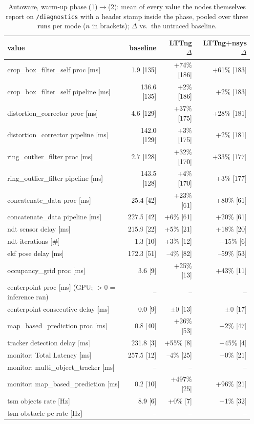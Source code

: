 \begin{table}[t]\centering\scriptsize
\caption{Autoware, warm-up phase (1)$\rightarrow$(2): mean of every value the nodes themselves report on \texttt{/diagnostics} with a header stamp inside the phase, pooled over three runs per mode ($n$ in brackets); $\Delta$ vs.\ the untraced baseline.}
\label{tab:aw-phase-warmup}
\begin{tabular}{lrrr}
\toprule
value & baseline & LTTng $\Delta$ & LTTng+nsys $\Delta$ \\
\midrule
crop\_box\_filter\_self proc [ms] & 1.9 [135] & +74\% [186] & +61\% [183] \\
crop\_box\_filter\_self pipeline [ms] & 136.6 [135] & +2\% [186] & +2\% [183] \\
distortion\_corrector proc [ms] & 4.6 [129] & +37\% [175] & +28\% [181] \\
distortion\_corrector pipeline [ms] & 142.0 [129] & +3\% [175] & +2\% [181] \\
ring\_outlier\_filter proc [ms] & 2.7 [128] & +32\% [170] & +33\% [177] \\
ring\_outlier\_filter pipeline [ms] & 143.5 [128] & +4\% [170] & +3\% [177] \\
concatenate\_data proc [ms] & 25.4 [42] & +23\% [61] & +80\% [61] \\
concatenate\_data pipeline [ms] & 227.5 [42] & +6\% [61] & +20\% [61] \\
ndt sensor delay [ms] & 215.9 [22] & +5\% [21] & +18\% [20] \\
ndt iterations [\#] & 1.3 [10] & +3\% [12] & +15\% [6] \\
ekf pose delay [ms] & 172.3 [51] & --4\% [82] & --59\% [53] \\
occupancy\_grid proc [ms] & 3.6 [9] & +25\% [13] & +43\% [11] \\
centerpoint proc [ms] (GPU; $>$0 = inference ran) & -- & -- & -- \\
centerpoint consecutive delay [ms] & 0.0 [9] & $\pm$0 [13] & $\pm$0 [17] \\
map\_based\_prediction proc [ms] & 0.8 [40] & +26\% [53] & +2\% [47] \\
tracker detection delay [ms] & 231.8 [3] & +55\% [8] & +45\% [4] \\
monitor: Total Latency [ms] & 257.5 [12] & --4\% [25] & +0\% [21] \\
monitor: multi\_object\_tracker [ms] & -- & -- & -- \\
monitor: map\_based\_prediction [ms] & 0.2 [10] & +497\% [25] & +96\% [21] \\
tsm objects rate [Hz] & 8.9 [6] & +0\% [7] & +1\% [32] \\
tsm obstacle pc rate [Hz] & -- & -- & -- \\
\bottomrule
\end{tabular}
\end{table}

